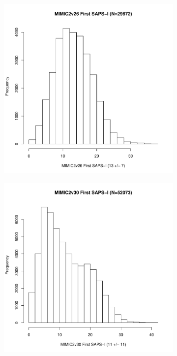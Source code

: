 \documentclass[10pt]{article}
\begin{document}
\begin{figure}
\centering
        \begin{subfigure}[b]{0.5\textwidth}
                \includegraphics[width=\linewidth]{../../figure/fig_hist_sapsi_first_mimic2v26.pdf}
        \end{subfigure}%
        \begin{subfigure}[b]{0.5\textwidth}
                \includegraphics[width=\linewidth]{../../figure/fig_hist_sapsi_first_mimic2v30.pdf}
        \end{subfigure}
\end{figure}
\end{document}
